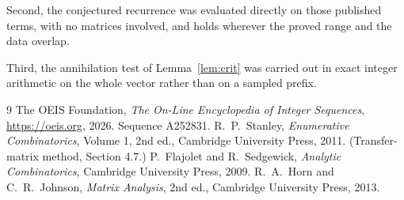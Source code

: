 \documentclass[11pt,a4paper]{article}
\theoremstyle{plain}
\theoremstyle{definition}
\begin{document}
Second, the conjectured recurrence was evaluated directly on those published terms, with no
matrices involved, and holds wherever the proved range and the data overlap.

Third, the annihilation test of Lemma~\ref{lem:crit} was carried out in exact integer
arithmetic on the whole vector rather than on a sampled prefix.

\begin{thebibliography}{9}
 The OEIS Foundation, \emph{The On-Line Encyclopedia of Integer
Sequences}, \url{https://oeis.org}, 2026. Sequence A252831.
 R.~P.~Stanley, \emph{Enumerative Combinatorics}, Volume 1, 2nd ed.,
Cambridge University Press, 2011. (Transfer-matrix method, Section 4.7.)
 P.~Flajolet and R.~Sedgewick, \emph{Analytic Combinatorics}, Cambridge
University Press, 2009.
 R.~A.~Horn and C.~R.~Johnson, \emph{Matrix Analysis}, 2nd ed., Cambridge
University Press, 2013.
\end{thebibliography}
\end{document}

